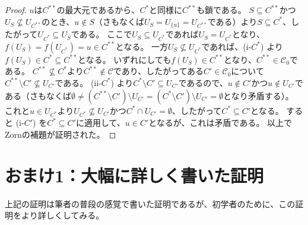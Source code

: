 ﻿\documentclass{ltjsarticle}
\theoremstyle{definition}
\begin{document}
\begin{proof}
    $u$は$C^{**}$の最大元であるから、$C^*$と同様に$C^{**}$も鎖である。
    $S \subseteq C^{**}$かつ$U_S \not\subseteq U_{C^{**}}$のとき、$u \not\in S$（さもなくば$U_S = U_{\{u\}} = U_{C^{**}}$である）より$S \subseteq C^*$、したがって$U_{C^*} \subseteq U_S$である。
    ここで$U_S \subseteq U_{C^*}$であれば$U_S = U_{C^*}$となり、$f(U_S) = f(U_{C^*}) = u \in C^{**}$となる。
    一方$U_S \not\subseteq U_{C^*}$であれば、(i-$C^*$) より$f(U_S) \in C^* \subseteq C^{**}$となる。
    いずれにしても$f(U_S) \in C^{**}$となり、$C^{**} \in \mathcal{C}_0$である。
    $C^{**} \not\subseteq C^*$より$C^{**} \not\in \mathcal{C}$であり、したがってある$C' \in \mathcal{C}_0$について$C^{**} \setminus C' \not\subseteq U_{C'}$である。
    (ii-$C^*$) より$C^* \setminus C' \subseteq U_{C'}$であるので、$u \not\in C'$かつ$u \not\in U_{C'}$である（さもなくば$\emptyset \neq (C^{**} \setminus C') \setminus U_{C'} = (C^* \setminus C') \setminus U_{C'} = \emptyset$となり矛盾する）。
    これと$u \in U_{C^*}$より$U_{C^*} \not\subseteq U_{C'}$かつ$C^* \cap U_{C'} = \emptyset$、したがって$C^* \subseteq C'$となる。
    すると (i-$C'$) を$C^* \subseteq C'$に適用して、$u \in C'$となるが、これは矛盾である。
    以上でZornの補題が証明された。
\end{proof}


\section*{おまけ1：大幅に詳しく書いた証明}

上記の証明は筆者の普段の感覚で書いた証明であるが、初学者のために、この証明をより詳しくしてみる。
\end{document}

